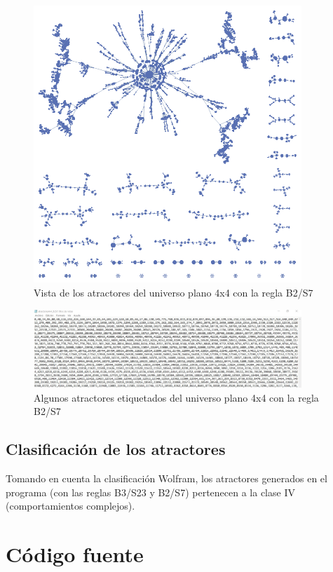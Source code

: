 \documentclass[12pt,a4paper]{book}
\begin{document}
\begin{figure}[H]
	\centering
	\includegraphics[width=0.9\textwidth]{imagen23PC}
	\caption{Vista de los atractores del universo plano 4x4 con la regla B2/S7}
\end{figure}
\begin{figure}[H]
	\centering
	\includegraphics[width=0.9\textwidth]{imagen24PC}
	\caption{Algunos atractores etiquetados del universo plano 4x4 con la regla B2/S7}
\end{figure}

\subsection{Clasificación de los atractores}
Tomando en cuenta la clasificación Wolfram, los atractores generados en el programa (con las reglas B3/S23 y B2/S7) pertenecen a la clase IV (comportamientos complejos).
	\section{Código fuente}
	
\end{document}
